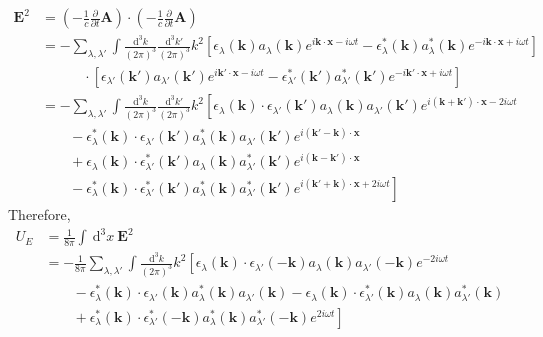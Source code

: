 \documentclass[12pt]{extarticle}
\newcommand{\dn}[2]{\: \mathrm{d}^{#1} #2 \:}
\newcommand{\pderiv}[2]{\frac{\partial{#1}}{\partial{#2}}}
\renewcommand{\bf}[1]{\mathbf{#1}}
\theoremstyle{definition}
\begin{document}
\begin{align*}
\bf{E}^2 & = \left( -\frac{1}{c} \pderiv{}{t} \bf{A} \right) \cdot \left( -\frac{1}{c} \pderiv{}{t} \bf{A} \right)
\\
& = - \sum_{\lambda, \lambda'} \int \frac{\dn{3}{k}}{(2 \pi)^3} \frac{\dn{3}{k'}}{(2 \pi)^3} k^2 \left[\epsilon_{\lambda}(\bf{k}) a_\lambda (\bf{k}) e^{i \bf{k} \cdot \bf{x} - i \omega t} - \epsilon_\lambda^*(\bf{k}) a_\lambda^*(\bf{k}) e^{- i \bf{k} \cdot \bf{x} + i \omega t} \right]
\\
& \quad \quad \quad \cdot \left[ \epsilon_{\lambda'}(\bf{k}') a_{\lambda'} (\bf{k}') e^{i \bf{k}' \cdot \bf{x} - i \omega t} - \epsilon_{\lambda'}^*(\bf{k}') a_{\lambda'}^*(\bf{k}') e^{- i \bf{k}' \cdot \bf{x} + i \omega t} \right]
\\
& = - \sum_{\lambda, \lambda'} \int \frac{\dn{3}{k}}{(2 \pi)^3} \frac{\dn{3}{k'}}{(2 \pi)^3} k^2 \left[ \epsilon_{\lambda}(\bf{k}) \cdot \epsilon_{\lambda'}(\bf{k}') a_{\lambda}(\bf{k}) a_{\lambda'}(\bf{k}') e^{i (\bf{k} + \bf{k}') \cdot \bf{x} - 2 i \omega t} 
\right.
\\
& \left. \quad \quad - \epsilon^*_{\lambda}(\bf{k}) \cdot  \epsilon_{\lambda'}(\bf{k}') a_\lambda^*(\bf{k}) a_{\lambda'}(\bf{k}') e^{i (\bf{k}' - \bf{k}) \cdot \bf{x}} 
\right. 
\\
& \left. \quad \quad + \epsilon_{\lambda}(\bf{k}) \cdot  \epsilon^*_{\lambda'}(\bf{k}') a_\lambda(\bf{k}) a_{\lambda'}^*(\bf{k}') e^{i (\bf{k} - \bf{k}') \cdot \bf{x}}
\right. 
\\
& \left. \quad \quad - \epsilon^*_{\lambda}(\bf{k}) \cdot  \epsilon^*_{\lambda'}(\bf{k}') a_\lambda^*(\bf{k}) a_{\lambda'}^*(\bf{k}') e^{i (\bf{k}' + \bf{k}) \cdot \bf{x} + 2 i \omega t} \right]
\end{align*}
Therefore,
\begin{align*}
U_E & = \frac{1}{8 \pi} \int \dn{3}{x} \bf{E}^2 
\\
& = - \frac{1}{8 \pi} \sum_{\lambda, \lambda'} \int \frac{\dn{3}{k}}{(2 \pi)^3} k^2 \left[ \epsilon_{\lambda}(\bf{k}) \cdot \epsilon_{\lambda'}(-\bf{k}) a_{\lambda}(\bf{k}) a_{\lambda'}(-\bf{k}) e^{- 2 i \omega t} 
\right.
\\
& \left. \quad \quad - \epsilon^*_{\lambda}(\bf{k}) \cdot \epsilon_{\lambda'}(\bf{k}) a_\lambda^*(\bf{k}) a_{\lambda'}(\bf{k})
- \epsilon_{\lambda}(\bf{k}) \cdot \epsilon^*_{\lambda'}(\bf{k}) a_\lambda(\bf{k}) a_{\lambda'}^*(\bf{k}) 
\right. 
\\
& \left. \quad \quad + \epsilon^*_{\lambda}(\bf{k}) \cdot \epsilon^*_{\lambda'}(-\bf{k}) a_\lambda^*(\bf{k}) a_{\lambda'}^*(-\bf{k}) e^{ 2 i \omega t} \right]  
\end{align*}
\end{document}
